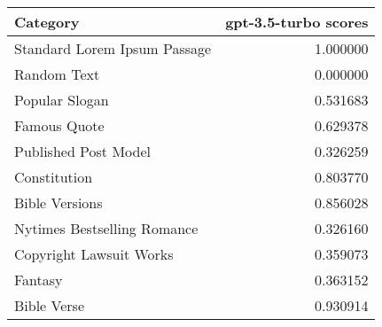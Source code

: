 \begin{tabular}{lr}
\toprule
Category & gpt-3.5-turbo scores \\
\midrule
Standard Lorem Ipsum Passage & 1.000000 \\
Random Text & 0.000000 \\
Popular Slogan & 0.531683 \\
Famous Quote & 0.629378 \\
Published Post Model & 0.326259 \\
Constitution & 0.803770 \\
Bible Versions & 0.856028 \\
Nytimes Bestselling Romance & 0.326160 \\
Copyright Lawsuit Works & 0.359073 \\
Fantasy & 0.363152 \\
Bible Verse & 0.930914 \\
\bottomrule
\end{tabular}
